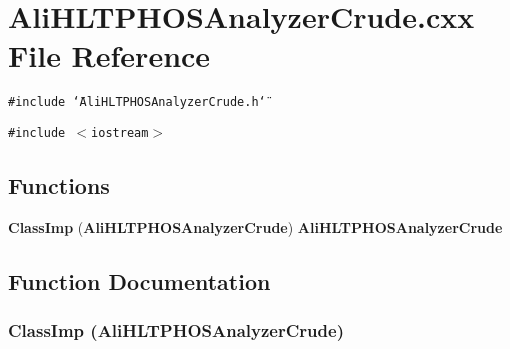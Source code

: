 \section{Ali\-HLTPHOSAnalyzer\-Crude.cxx File Reference}
\label{AliHLTPHOSAnalyzerCrude_8cxx}
{\tt \#include \char`\"{}Ali\-HLTPHOSAnalyzer\-Crude.h\char`\"{}}\par
{\tt \#include $<$iostream$>$}\par
\subsection*{Functions}
\begin{CompactItemize}
\item 
{\bf Class\-Imp} ({\bf Ali\-HLTPHOSAnalyzer\-Crude}) {\bf Ali\-HLTPHOSAnalyzer\-Crude}
\end{CompactItemize}


\subsection{Function Documentation}
\subsubsection{\setlength{\rightskip}{0pt plus 5cm}Class\-Imp ({\bf Ali\-HLTPHOSAnalyzer\-Crude})}\label{AliHLTPHOSAnalyzerCrude_8cxx_a0}


